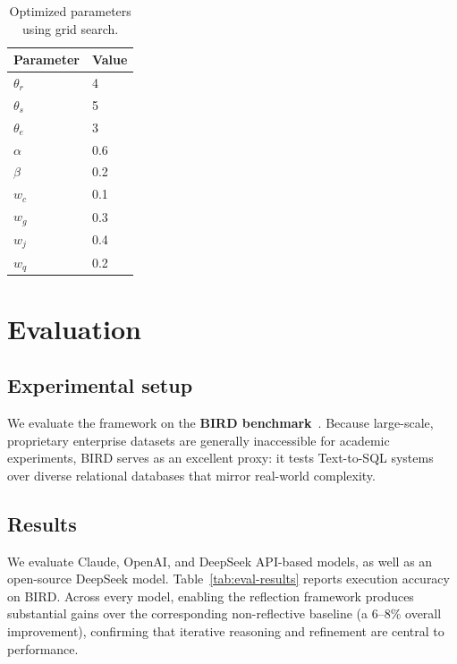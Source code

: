 \begin{table}[ht]
\centering
\begin{tabular}{ll}
\toprule
\textbf{Parameter} & \textbf{Value} \\
\midrule
$\theta_r$ & 4 \\
$\theta_s$ & 5 \\
$\theta_e$ & 3 \\
$\alpha$   & 0.6 \\
$\beta$    & 0.2 \\
$w_c$      & 0.1 \\
$w_g$      & 0.3 \\
$w_j$      & 0.4 \\
$w_q$      & 0.2 \\
\bottomrule
\end{tabular}
\caption{Optimized parameters using grid search.}
\label{tab:optimized-params}
\end{table}

\section{Evaluation}
\subsection{Experimental setup}
We evaluate the framework on the \textbf{BIRD benchmark}~\cite{li2023bird}. Because large-scale, proprietary enterprise datasets are generally inaccessible for academic experiments, BIRD serves as an excellent proxy: it tests Text-to-SQL systems over diverse relational databases that mirror real-world complexity.

\subsection{Results}
We evaluate Claude, OpenAI, and DeepSeek API-based models, as well as an open-source DeepSeek model. Table~\ref{tab:eval-results} reports execution accuracy on BIRD. Across every model, enabling the reflection framework produces substantial gains over the corresponding non-reflective baseline (a 6--8\% overall improvement), confirming that iterative reasoning and refinement are central to performance.


